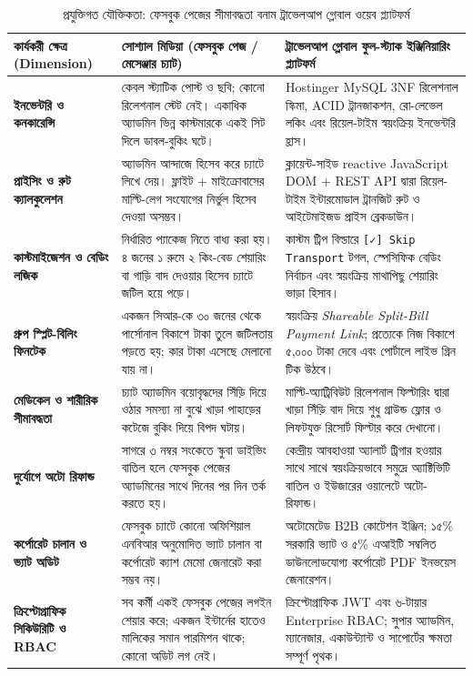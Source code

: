 \documentclass[11pt,a4paper]{article}
\begin{document}
\begin{table}[H]
\centering
\scriptsize
\renewcommand{\arraystretch}{1.2}
\begin{tabularx}{\textwidth}{p{2.6cm} p{5.0cm} X}
\toprule
\textbf{কার্যকরী ক্ষেত্র (Dimension)} & \textbf{সোশ্যাল মিডিয়া (ফেসবুক পেজ / মেসেঞ্জার চ্যাট)} & \textbf{ট্রাভেলআপ গ্লোবাল ফুল-স্ট্যাক ইঞ্জিনিয়ারিং প্ল্যাটফর্ম} \\
\midrule
\textbf{ইনভেন্টরি ও কনকারেন্সি} & কেবল স্ট্যাটিক পোস্ট ও ছবি; কোনো রিলেশনাল স্টেট নেই। একাধিক অ্যাডমিন ভিন্ন কাস্টমারকে একই সিট দিলে ডাবল-বুকিং ঘটে। & Hostinger MySQL 3NF রিলেশনাল স্কিমা, ACID ট্রানজাকশন, রো-লেভেল লকিং এবং রিয়েল-টাইম স্বয়ংক্রিয় ইনভেন্টরি হ্রাস। \\
\addlinespace
\textbf{প্রাইসিং ও রুট ক্যালকুলেশন} & অ্যাডমিন আন্দাজে হিসেব করে চ্যাটে লিখে দেয়। ফ্লাইট + মাইক্রোবাসের মাল্টি-লেগ সংযোগের নির্ভুল হিসেব দেওয়া অসম্ভব। & ক্লায়েন্ট-সাইড reactive JavaScript DOM + REST API দ্বারা রিয়েল-টাইম ইন্টারমোডাল ট্রানজিট রুট ও আইটেমাইজড প্রাইস ব্রেকডাউন। \\
\addlinespace
\textbf{কাস্টমাইজেশন ও বেডিং লজিক} & নির্ধারিত প্যাকেজ নিতে বাধ্য করা হয়। ৪ জনের ১ রুমে ২ কিং-বেড শেয়ারিং বা গাড়ি বাদ দেওয়ার হিসেব চ্যাটে জটিল হয়ে পড়ে। & কাস্টম ট্রিপ বিল্ডারে \texttt{[✓] Skip Transport} টগল, স্পেসিফিক বেডিং নির্বাচন এবং স্বয়ংক্রিয় মাথাপিছু শেয়ারিং ভাড়া হিসাব। \\
\addlinespace
\textbf{গ্রুপ স্প্লিট-বিলিং ফিনটেক} & একজন সিআর-কে ৩০ জনের থেকে পার্সোনাল বিকাশে টাকা তুলে জটিলতায় পড়তে হয়; কার টাকা এসেছে মেলানো যায় না। & স্বয়ংক্রিয় \textit{Shareable Split-Bill Payment Link}; প্রত্যেকে নিজ বিকাশে ৫,০০০ টাকা দেবে এবং পোর্টালে লাইভ গ্রিন টিক উঠবে। \\
\addlinespace
\textbf{মেডিকেল ও শারীরিক সীমাবদ্ধতা} & চ্যাট অ্যাডমিন বয়োবৃদ্ধদের সিঁড়ি দিয়ে ওঠার সমস্যা না বুঝে খাড়া পাহাড়ের কটেজে বুকিং দিয়ে বিপদ ঘটায়। & মাল্টি-অ্যাট্রিবিউট রিলেশনাল ফিল্টারিং দ্বারা খাড়া সিঁড়ি বাদ দিয়ে শুধু গ্রাউন্ড ফ্লোর ও লিফটযুক্ত রিসোর্ট ফিল্টার করে দেখানো। \\
\addlinespace
\textbf{দুর্যোগে অটো রিফান্ড} & সাগরে ৩ নম্বর সংকেতে স্কুবা ডাইভিং বাতিল হলে ফেসবুক পেজের অ্যাডমিনের সাথে দিনের পর দিন তর্ক করতে হয়। & কেন্দ্রীয় আবহাওয়া অ্যালার্ট ট্রিগার হওয়ার সাথে সাথে স্বয়ংক্রিয়ভাবে সমুদ্রে অ্যাক্টিভিটি বাতিল ও ইউজারের ওয়ালেটে অটো-রিফান্ড। \\
\addlinespace
\textbf{কর্পোরেট চালান ও ভ্যাট অডিট} & ফেসবুক চ্যাটে কোনো অফিশিয়াল এনবিআর অনুমোদিত ভ্যাট চালান বা কর্পোরেট ক্যাশ মেমো জেনারেট করা সম্ভব নয়। & অটোমেটেড B2B কোটেশন ইঞ্জিন; ১৫\% সরকারি ভ্যাট ও ৫\% এআইটি সম্বলিত ডাউনলোডযোগ্য কর্পোরেট PDF ইনভয়েস জেনারেশন। \\
\addlinespace
\textbf{ক্রিপ্টোগ্রাফিক সিকিউরিটি ও RBAC} & সব কর্মী একই ফেসবুক পেজের লগইন শেয়ার করে; একজন ইন্টার্নের হাতেও মালিকের সমান পারমিশন থাকে; কোনো অডিট লগ নেই। & ক্রিপ্টোগ্রাফিক JWT এবং ৬-টায়ার Enterprise RBAC; সুপার অ্যাডমিন, ম্যানেজার, একাউন্ট্যান্ট ও সাপোর্টের ক্ষমতা সম্পূর্ণ পৃথক। \\
\bottomrule
\end{tabularx}
\caption{প্রযুক্তিগত যৌক্তিকতা: ফেসবুক পেজের সীমাবদ্ধতা বনাম ট্রাভেলআপ গ্লোবাল ওয়েব প্ল্যাটফর্ম}
\label{tab:fb_vs_web_bn}
\end{table}
\end{document}

